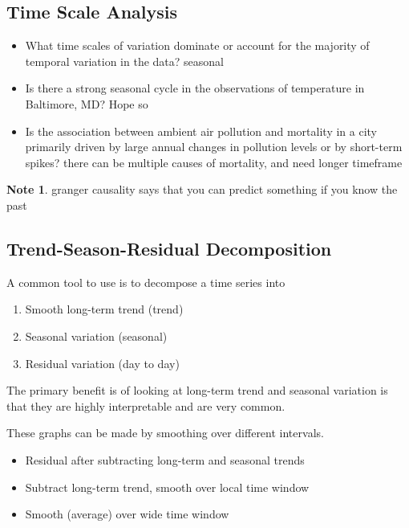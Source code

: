 \documentclass[11pt]{article}
\theoremstyle{definition}
\newtheorem{note}{Note}
\begin{document}
\subsection{Time Scale Analysis}
\begin{itemize}
  \item What time scales of variation dominate or account for the
  majority of temporal variation in the data? seasonal
  \item Is there a strong seasonal cycle in the observations of
  temperature in Baltimore, MD? Hope so
  \item Is the association between ambient air pollution and mortality in
  a city primarily driven by large annual changes in pollution
  levels or by short-term spikes? there can be multiple causes of mortality, and need longer timeframe
\end{itemize}
\begin{note}
  granger causality says that you can predict something if you know the past
\end{note}

\subsection{Trend-Season-Residual Decomposition}
A common tool to use is to
decompose a time series into

\begin{enumerate}
  \item Smooth long-term trend (trend)
  \item Seasonal variation (seasonal)
  \item Residual variation (day to day)
\end{enumerate}

The primary benefit is of
looking at long-term trend
and seasonal variation is that
they are highly interpretable
and are very common.

These graphs can be made by smoothing over different intervals.

\begin{itemize}
  \item Residual after subtracting
  long-term and seasonal trends
  \item Subtract long-term trend,
  smooth over local time window
  \item Smooth (average) over
  wide time window
\end{itemize}
\end{document}

